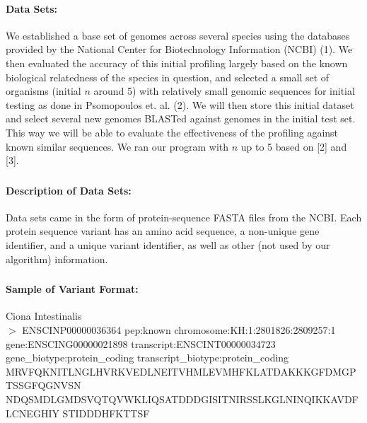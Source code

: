 \documentclass[11pt, oneside]{article}
\begin{document}
\paragraph
{\bfseries Data Sets:} We established a base set of genomes across several species using the databases provided by the National Center for Biotechnology Information (NCBI) (1). We then evaluated the accuracy of this initial profiling largely based on the known biological relatedness of the species in question, and selected a small set of organisms (initial $n$ around 5) with relatively small genomic sequences for initial testing as done in Psomopoulos et. al. (2). We will then store this initial dataset and select several new genomes BLASTed against genomes in the initial test set. This way we will be able to evaluate the effectiveness of the profiling against known similar sequences. We ran our program with $n$ up to 5 based on [2] and [3].

\subsubsection{}
\paragraph
{\bfseries Description of Data Sets:} Data sets came in the form of protein-sequence FASTA files from the NCBI. Each protein sequence variant has an amino acid sequence, a non-unique gene identifier, and a unique variant identifier, as well as other (not used by our algorithm) information.

\subsubsection{}
\paragraph
{\bfseries Sample of Variant Format:} Ciona Intestinalis \\
$>$ ENSCINP00000036364 pep:known chromosome:KH:1:2801826:2809257:1 gene:ENSCING00000021898 transcript:ENSCINT00000034723 gene\_biotype:protein\_coding transcript\_biotype:protein\_coding MRVFQKNITLNGLHVRKVEDLNEITVHMLEVMHFKLATDAKKKGFDMGPTSSGFQGNVSN
NDQSMDLGMDSVQTQVWKLIQSATDDDGISITNIRSSLKGLNINQIKKAVDFLCNEGHIY
STIDDDHFKTTSF
\end{document}
